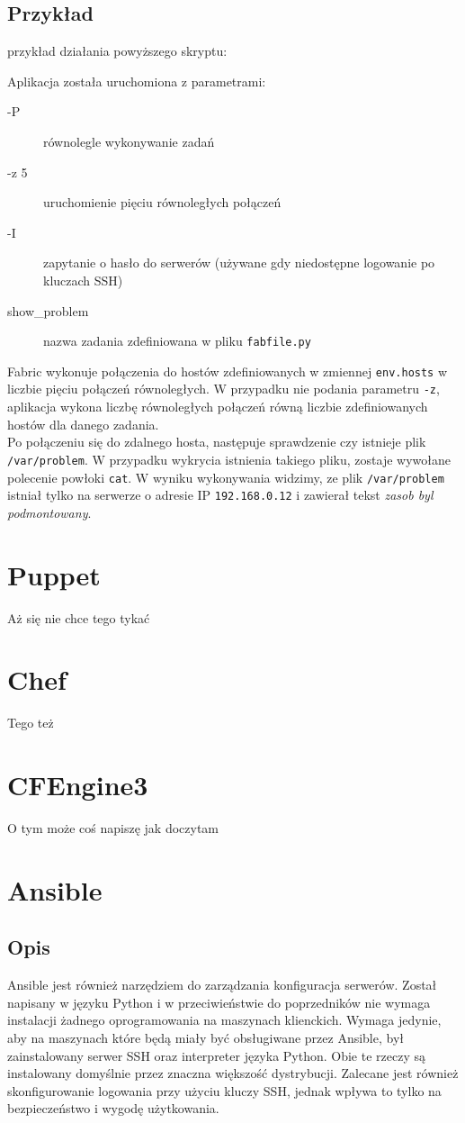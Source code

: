 \subsection{Przykład}

przykład działania powyższego skryptu:

Aplikacja została uruchomiona z parametrami:
\begin{description}
\item[-P] równolegle wykonywanie zadań
\item[-z 5] uruchomienie pięciu równoległych połączeń
\item[-I] zapytanie o hasło do serwerów (używane gdy niedostępne logowanie po kluczach SSH)
\item[show\_problem] nazwa zadania zdefiniowana w pliku \texttt{fabfile.py}
\end{description}
Fabric wykonuje połączenia do hostów zdefiniowanych w zmiennej \texttt{env.hosts} w liczbie pięciu połączeń równoległych.
W przypadku nie podania parametru \texttt{-z}, aplikacja wykona liczbę równoległych połączeń równą liczbie zdefiniowanych hostów dla danego zadania.\\
Po połączeniu się do zdalnego hosta, następuje sprawdzenie czy istnieje plik \texttt{/var/problem}. W przypadku wykrycia istnienia takiego pliku, zostaje wywołane polecenie powłoki \texttt{cat}.
W wyniku wykonywania widzimy, ze plik \texttt{/var/problem} istniał tylko na serwerze o adresie IP \texttt{192.168.0.12} i zawierał tekst \textit{zasob byl podmontowany}.
\section{Puppet}
Aż się nie chce tego tykać
\section{Chef}
Tego też
\section{CFEngine3}
O tym może coś napiszę jak doczytam
\section{Ansible}
\subsection{Opis}
Ansible jest również narzędziem do zarządzania konfiguracja serwerów. Został napisany w języku Python i w przeciwieństwie do poprzedników nie wymaga instalacji żadnego oprogramowania na maszynach klienckich.
Wymaga jedynie, aby na maszynach które będą miały być obsługiwane przez Ansible, był zainstalowany serwer SSH oraz interpreter języka Python. Obie te rzeczy są instalowany domyślnie przez znaczna większość dystrybucji.
Zalecane jest również skonfigurowanie logowania przy użyciu kluczy SSH, jednak wpływa to tylko na bezpieczeństwo i wygodę użytkowania.\\
